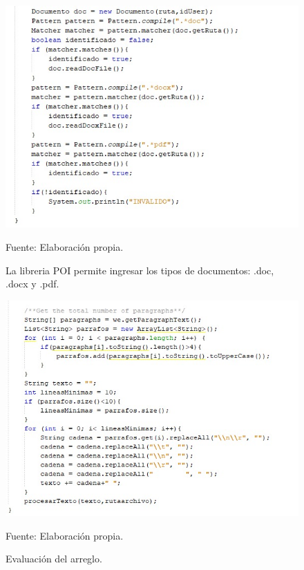 \begin{figure}[h!]
	\centering
		\includegraphics[scale=0.7]{imagenes/PoiFormatoDoc.jpeg}
		\caption{La libreria POI permite ingresar los tipos de documentos: .doc, .docx y .pdf.}
		\begin{center}
    Fuente: Elaboración propia.
    \end{center}
	\label{fig:TiposDocumentosPOI}
\end{figure}

\begin{figure}[h!]
	\centering
		\includegraphics[scale=0.7]{imagenes/Mayus10EliminaEspacios.jpeg}
		\caption{Evaluación del arreglo.}
		\begin{center}
    Fuente: Elaboración propia.
    \end{center}
	\label{fig:Mayusculas10EliminaEspaciosTabulacion}
\end{figure}

